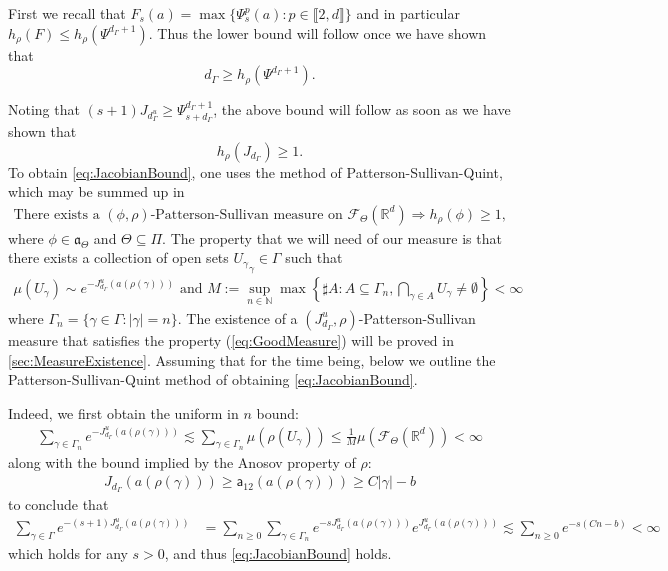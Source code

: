 \documentclass{report}
\begin{document}
First we recall that $F_s(a) = \max \{ \Psi_s^p(a) : p \in \llbracket 2, d \rrbracket\}$ and in particular $h_\rho(F) \leq h_\rho(\Psi^{d_\Gamma + 1})$.
Thus the lower bound will follow once we have shown that
$$d_\Gamma \geq h_\rho(\Psi^{d_\Gamma + 1}).$$

Noting that $(s+1) J_{d_\Gamma^u} \geq \Psi_{s+d_\Gamma}^{d_\Gamma + 1}$, the above bound will follow as soon as we have shown that
\begin{equation}\label{eq:JacobianBound}
    h_\rho(J_{d_\Gamma}) \geq 1.\tag{LB}
\end{equation}
To obtain \cref{eq:JacobianBound}, one uses the method of Patterson-Sullivan-Quint, which may be summed up in
\begin{align*}
    \text{There exists a } (\phi, \rho)\text{-Patterson-Sullivan measure on } \mathcal F_\Theta(\mathbb R^d) 
    \Rightarrow h_\rho(\phi) \geq 1,
\end{align*}
where $\phi \in \mathfrak a_\Theta$ and $ \Theta \subseteq \Pi$.
The property that we will need of our measure is that there exists a collection of open sets ${U_\gamma}_\gamma \in \Gamma$ such that
\begin{align*}\label{eq:GoodMeasure}
    \mu(U_\gamma) \sim e^{-J_{d_\Gamma}^u(a(\rho(\gamma)))} \text{ and } 
    M := \sup_{n \in \mathbb N}
    \max
    \left\{\sharp A : A \subseteq \Gamma_n,  \bigcap_{\gamma \in A}U_\gamma \neq \emptyset \right\} < \infty\tag{MP}
\end{align*}
where $\Gamma_n = \{ \gamma \in \Gamma : |\gamma| = n \} $.
The existence of a $(J_{d_\Gamma}^u, \rho)$-Patterson-Sullivan measure that satisfies the property (\ref{eq:GoodMeasure}) will be proved in \cref{sec:MeasureExistence}.
Assuming that for the time being, below we outline the Patterson-Sullivan-Quint method of obtaining \cref{eq:JacobianBound}.

Indeed, we first obtain the uniform in $n$ bound:
\begin{align*}
    \sum_{\gamma \in \Gamma_n}
    e^{-J_{d_\Gamma}^u(a(\rho(\gamma)))} \lesssim
    \sum_{\gamma \in \Gamma_n}
    \mu(\rho(U_\gamma)) \leq \frac{1}{M} \mu(\mathcal F_\Theta(\mathbb R^d)) < \infty
\end{align*}
along with the bound implied by the Anosov property of $\rho$:
\begin{align*}
J_{d_\Gamma}(a(\rho(\gamma))) \geq \mathsf a_{12} (a(\rho(\gamma))) \geq C|\gamma| - b
\end{align*}
to conclude that
\begin{align*}
\sum_{\gamma \in \Gamma} e^{-(s+1)J^u_{d_\Gamma}(a(\rho(\gamma)))} &=
\sum_{n\geq 0} \sum_{\gamma \in \Gamma_n} e^{-s J^u_{d_\Gamma}(a(\rho(\gamma)))}
    e^{J^u_{d_\Gamma}(a(\rho(\gamma)))} \lesssim
\sum_{n\geq 0} e^{-s(Cn - b)} < \infty
\end{align*}
which holds for any $s>0$, and thus \cref{eq:JacobianBound} holds.
\end{document}
